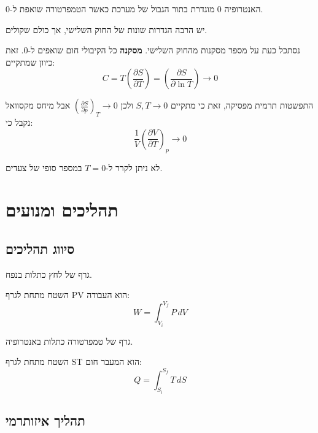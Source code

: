 \documentclass{tstextbook}
\begin{document}
\begin{theorem}
האנטרופיה 0 מוגדרת בתור הגבול של מערכת כאשר הטמפרטורה שואפת ל-0.

\end{theorem}
\begin{remark}
יש הרבה הגדרות שונות של החוק השלישי, אך כולם שקולים.

\end{remark}
נסתכל כעת על מספר מסקנות מהחוק השלישי.
\textbf{מסקנה}
כל הקיבולי חום שואפים ל-0. זאת כיוון שמתקיים:
$$C=T\left({\frac{\partial S}{\partial T}}\right)=\left({\frac{\partial S}{\partial\ln T}}\right)\rightarrow 0$$

\begin{corollary}
התפשטות תרמית מפסיקה, זאת כי מתקיים \(S,T\to 0\) ולכן \(\left(\frac{\partial S}{\partial p}\right)_{T}\rightarrow0\) אבל מיחס מקסוואל נקבל כי:
$$\frac{1}{V}\left(\frac{\partial V}{\partial T}\right)_{p}\rightarrow0$$

\end{corollary}
\begin{corollary}
לא ניתן לקרר ל-\(T=0\) במספר סופי של צעדים.

\end{corollary}
\section{תהליכים ומנועים}

\subsection{סיווג תהליכים}

\begin{definition}[גרף PV]
גרף של לחץ כתלות בנפח.

\end{definition}
\begin{proposition}
השטח מתחת לגרף PV הוא העבודה:
$$W=\int_{V_{i}}^{V_{f}}P\,d V$$

\end{proposition}
\begin{definition}[גרף ST]
גרף של טמפרטורה כתלות באנטרופיה.

\end{definition}
\begin{proposition}
השטח מתחת לגרף ST הוא המעבר חום:
$$Q=\int_{S_{i}}^{S_{f}}T\,d S$$

\end{proposition}
\subsection{תהליך איזותרמי}
\end{document}
